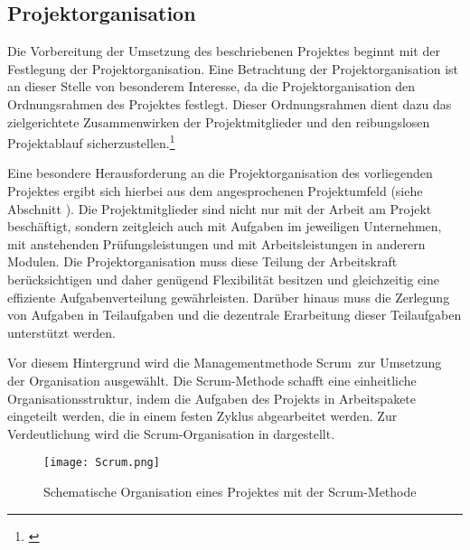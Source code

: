 \subsection{Projektorganisation}
\label{sec:Projektorganisation}

Die Vorbereitung der Umsetzung des beschriebenen Projektes beginnt mit der Festlegung der Projektorganisation.
Eine Betrachtung der Projektorganisation ist an dieser Stelle von besonderem Interesse, da die Projektorganisation
den Ordnungsrahmen des Projektes festlegt.
Dieser Ordnungsrahmen dient dazu das zielgerichtete Zusammenwirken
der Projektmitglieder und den reibungslosen Projektablauf sicherzustellen.\footnote{\citet[S.~15]{geiger2009}}

Eine besondere Herausforderung an die Projektorganisation des vorliegenden Projektes ergibt sich hierbei
aus dem angesprochenen Projektumfeld (siehe Abschnitt ). Die Projektmitglieder sind
nicht nur mit der Arbeit am Projekt beschäftigt, sondern zeitgleich auch mit Aufgaben im jeweiligen
Unternehmen, mit anstehenden Prüfungsleistungen und mit Arbeitsleistungen in anderern Modulen.
Die Projektorganisation muss diese Teilung der Arbeitskraft berücksichtigen und daher genügend Flexibilität
besitzen und gleichzeitig eine effiziente Aufgabenverteilung gewährleisten. Darüber hinaus muss
die Zerlegung von Aufgaben in Teilaufgaben und die dezentrale Erarbeitung dieser Teilaufgaben unterstützt werden.

Vor diesem Hintergrund wird die Managementmethode Scrum\footnotemark\ zur Umsetzung der Organisation ausgewählt.
Die Scrum-Methode schafft eine einheitliche Organisationsstruktur, 
indem die Aufgaben des Projekts in Arbeitspakete eingeteilt werden,
die in einem festen Zyklus abgearbeitet werden. Zur Verdeutlichung wird die Scrum-Organisation in 
dargestellt.


\clearpage
\begin{figure}[htb] 
\centering
\texttt{[image: Scrum.png]}
\caption[Scrum-Organisation]{Schematische Organisation eines Projektes mit der Scrum-Methode\protect\footnotemark}
\label{fig:Scrum}
\end{figure}

